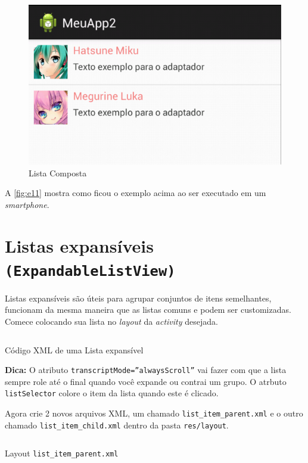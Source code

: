 \documentclass[a4paper,12pt,brazil,oneside]{book}
\begin{document}
\begin{figure}[H]
  \centering
  \includegraphics[width=.475\textwidth]{figuras/design/lista-composta.png}
  \caption{Lista Composta}
  \label{fig:e11}
\end{figure}

A \autoref{fig:e11} mostra como ficou o exemplo acima ao ser executado em um \emph{smartphone}. 

\section{Listas expansíveis \texttt{(ExpandableListView)}}

Listas expansíveis são úteis para agrupar conjuntos de itens semelhantes, funcionam da mesma maneira que as listas comuns e podem ser customizadas.
Comece colocando sua lista no \emph{layout} da \emph{activity} desejada.
	
\begin{listing}[H]
\inputminted[linenos=true,fontsize=\small,frame=lines, framesep=2mm, tabsize=2,numbersep=5pt]{xml}{src/design/exlist.xml}
\caption{Código XML de uma Lista expansível}
\end{listing}	

\begin{framed}
\textbf{Dica:} O atributo \texttt{transcriptMode=''alwaysScroll''} vai fazer com que a lista sempre role até o final quando você expande ou contrai um grupo.
O atrbuto \texttt{listSelector} colore o item da lista quando este é clicado.
\end{framed}

Agora crie 2 novos arquivos XML, um chamado \texttt{list\_item\_parent.xml} e o outro chamado \texttt{list\_item\_child.xml} dentro da pasta \texttt{res/layout}.

\begin{listing}[H]
\inputminted[linenos=true,fontsize=\small,frame=lines, framesep=2mm, tabsize=2,numbersep=5pt]{xml}{src/design/list-item-parent.xml}
\caption{Layout \texttt{list\_item\_parent.xml}}
\end{listing}	
\end{document}
